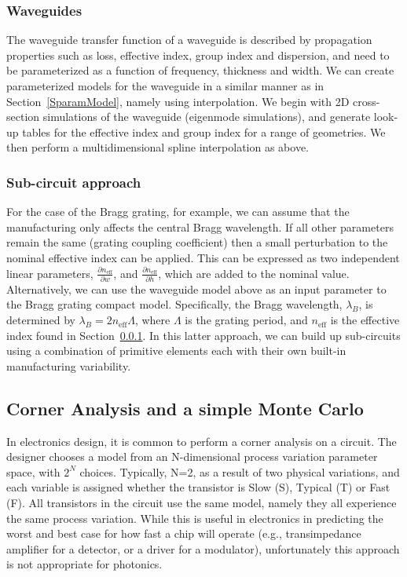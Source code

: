 \documentclass[journal]{spie}
\begin{document}
\subsubsection{Waveguides}
\label{sec:waveguide}
The waveguide transfer function of a waveguide is described by propagation properties such as loss, effective index, group index and dispersion, and need to be parameterized as a function of frequency, thickness and width. 
We can create parameterized models for the waveguide in a similar manner as in Section~\ref{SparamModel}, namely using interpolation.  We begin with 2D cross-section simulations of the waveguide (eigenmode simulations), and generate look-up tables for the effective index and group index for a range of geometries.  We then perform a multidimensional spline interpolation as above.

\subsubsection{Sub-circuit approach}
For the case of the Bragg grating, for example, we can assume that the manufacturing only affects the central Bragg wavelength.  If all other parameters remain the same (grating coupling coefficient) then a small perturbation to the nominal effective index can be applied.  This can be expressed as two independent linear parameters, $ \frac{\partial n_\text{eff}}{\partial w}$, and $ \frac{\partial n_\text{eff}}{\partial h}$, which are added to the nominal value.  Alternatively, we can use the waveguide model above as an input parameter to the Bragg grating compact model.  Specifically, the Bragg wavelength, $\lambda_B$, is determined by $\lambda_B = 2 n_\text{eff} \Lambda$, where $\Lambda$ is the grating period, and $n_\text{eff}$ is the effective index found in Section~\ref{sec:waveguide}.  In this latter approach, we can build up sub-circuits using a combination of primitive elements each with their own built-in manufacturing variability.

\subsection{Corner Analysis and a simple Monte Carlo}
\label{sec:corner}
In electronics design, it is common to perform a corner analysis on a circuit.  The designer chooses a model from an N-dimensional process variation parameter space, with $2^N$ choices.  Typically, N=2, as a result of two physical variations, and each variable is assigned whether the transistor is Slow (S), Typical (T) or Fast (F).  All transistors in the circuit use the same model, namely they all experience the same process variation.  While this is useful in electronics in predicting the worst and best case for how fast a chip will operate (e.g., transimpedance amplifier for a detector, or a driver for a modulator), unfortunately this approach is not appropriate for photonics.  
\end{document}
